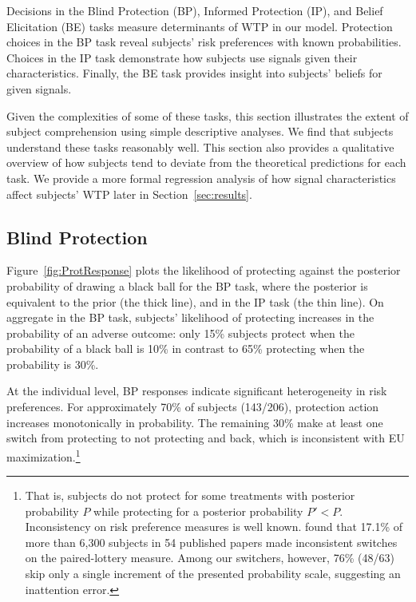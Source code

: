 \documentclass[12pt,a4paper]{article}
\begin{document}
Decisions in the Blind Protection (BP), Informed Protection (IP), and Belief Elicitation (BE) tasks measure determinants of WTP in our model. Protection choices in the BP task reveal subjects' risk preferences with known probabilities. Choices in the IP task demonstrate how subjects use signals given their characteristics. Finally, the BE task provides insight into subjects' beliefs for given signals.  

Given the complexities of some of these tasks, this section illustrates the extent of subject comprehension using simple descriptive analyses. We find that subjects understand these tasks reasonably well. This section also provides a qualitative overview of how subjects tend to deviate from the theoretical predictions for each task. We provide a more formal regression analysis of how signal characteristics affect subjects' WTP later in Section~\ref{sec:results}.

\subsection{Blind Protection}

Figure~\ref{fig:ProtResponse} plots the likelihood of protecting against the posterior probability of drawing a black ball for the BP task, where the posterior is equivalent to the prior (the thick line), and in the IP task (the thin line). On aggregate in the BP task, subjects' likelihood of protecting increases in the probability of an adverse outcome: only 15\% subjects protect when the probability of a black ball is 10\% in contrast to 65\% protecting when the probability is 30\%.

At the individual level, BP responses indicate significant heterogeneity in risk preferences. For approximately 70\% of subjects (143/206), protection action increases monotonically in probability. The remaining 30\% make at least one switch from protecting to not protecting and back, which is inconsistent with EU maximization.\footnote{That is, subjects do not protect for some treatments with posterior probability $P$ while protecting for a posterior probability $P'<P$.  Inconsistency on risk preference measures is well known.  \citet{filippin_reconsideration_2016} found that 17.1\% of more than 6,300 subjects in 54 published papers made inconsistent switches on the \citet{holt_risk_2002} paired-lottery measure. Among our switchers, however, 76\% (48/63) skip only a single increment of the presented probability scale, suggesting an inattention error.}
\end{document}
